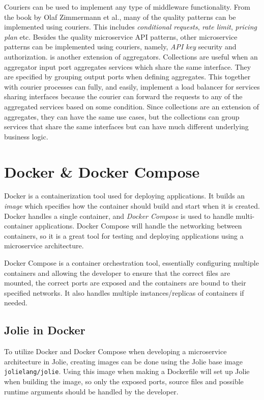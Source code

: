 Couriers can be used to implement any type of middleware functionality. From the book by Olaf Zimmermann et al., many of the quality patterns can be implemented using couriers. This includes
\textit{conditional requests}, \textit{rate limit}, \textit{pricing plan} etc. Besides the quality microservice API patterns, other microservice patterns can be implemented using couriers, namely, \textit{API key} security and authorization.
 is another extension of aggregators. Collections are useful when an aggregator input port aggregates services which share the same interface.
They are specified by grouping output ports when defining aggregates.
This together with courier processes can fully, and easily, implement a load balancer for services sharing interfaces because the courier can forward the requests to any of the aggregated services based on some condition.
Since collections are an extension of aggregates, they can have the same use cases, but the collections can group services that share the same interfaces but can have much different underlying business logic.

\section{Docker \& Docker Compose}
Docker is a containerization tool used for deploying applications. It builds an \textit{image} which specifies how the container should build and start when it is created.
Docker handles a single container, and \textit{Docker Compose} is used to handle multi-container applications. Docker Compose will handle the networking between containers, so it is a great tool for testing and deploying applications using a microservice architecture.

Docker Compose is a container orchestration tool, essentially configuring multiple containers and allowing the developer to ensure that the correct files are mounted, the correct ports are exposed and the containers are bound to their specified networks. It also handles multiple instances/replicas
of containers if needed.

\subsection{Jolie in Docker}
To utilize Docker and Docker Compose when developing a microservice architecture in Jolie, creating images can be done using the Jolie base image \texttt{jolielang/jolie}.
Using this image when making a Dockerfile will set up Jolie when building the image, so only the exposed ports, source files and possible runtime arguments should be handled by the developer.

